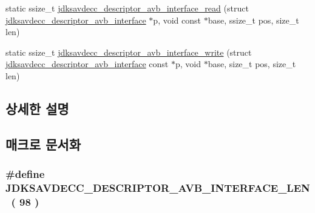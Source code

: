 \begin{DoxyCompactItemize}
static ssize\+\_\+t \hyperlink{group__descriptor__avb__interface_gad80aed01289a8f178df1e63a1520afda}{jdksavdecc\+\_\+descriptor\+\_\+avb\+\_\+interface\+\_\+read} (struct \hyperlink{structjdksavdecc__descriptor__avb__interface}{jdksavdecc\+\_\+descriptor\+\_\+avb\+\_\+interface} $\ast$p, void const $\ast$base, ssize\+\_\+t pos, size\+\_\+t len)
\item 
static ssize\+\_\+t \hyperlink{group__descriptor__avb__interface_gada599ed47baa3ae5364320348034128f}{jdksavdecc\+\_\+descriptor\+\_\+avb\+\_\+interface\+\_\+write} (struct \hyperlink{structjdksavdecc__descriptor__avb__interface}{jdksavdecc\+\_\+descriptor\+\_\+avb\+\_\+interface} const $\ast$p, void $\ast$base, size\+\_\+t pos, size\+\_\+t len)
\end{DoxyCompactItemize}


\subsection{상세한 설명}


\subsection{매크로 문서화}
\subsubsection[{\texorpdfstring{J\+D\+K\+S\+A\+V\+D\+E\+C\+C\+\_\+\+D\+E\+S\+C\+R\+I\+P\+T\+O\+R\+\_\+\+A\+V\+B\+\_\+\+I\+N\+T\+E\+R\+F\+A\+C\+E\+\_\+\+L\+EN}{JDKSAVDECC_DESCRIPTOR_AVB_INTERFACE_LEN}}]{\setlength{\rightskip}{0pt plus 5cm}\#define J\+D\+K\+S\+A\+V\+D\+E\+C\+C\+\_\+\+D\+E\+S\+C\+R\+I\+P\+T\+O\+R\+\_\+\+A\+V\+B\+\_\+\+I\+N\+T\+E\+R\+F\+A\+C\+E\+\_\+\+L\+EN~( 98 )}\hypertarget{group__descriptor__avb__interface_gaa0de60188c16df7f04fbc87d490112bc}{}\label{group__descriptor__avb__interface_gaa0de60188c16df7f04fbc87d490112bc}


